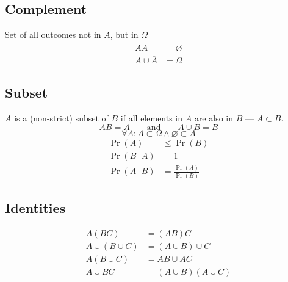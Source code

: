 \documentclass{article}
\begin{document}
\begin{multicols}{3}
    \subsection{Complement}
    Set of all outcomes not in \(A\), but in \(\Omega \)
    \begin{align*}
        A\overline{A}       & = \varnothing \\
        A \cup \overline{A} & = \Omega
    \end{align*}
    \subsection{Subset}
    \(A\) is a (non-strict) subset of \(B\) if all elements in \(A\) are also in \(B\) --- \(A \subset B\).
    \begin{equation*}
        AB = A \quad\quad \text{and} \quad\quad A \cup B = B
    \end{equation*}
    \begin{equation*}
        \forall A:A\subset \Omega \land \varnothing \subset A
    \end{equation*}
    \begin{align*}
        \Pr{\left( A \right)}             & \leq \Pr{\left( B \right)}                            \\
        \Pr{\left( B \,\vert\, A \right)} & = 1                                                   \\
        \Pr{\left( A \,\vert\, B \right)} & = \frac{\Pr{\left( A \right)}}{\Pr{\left( B \right)}}
    \end{align*}
    \subsection{Identities}
    \begin{align*}
        A \left( BC \right)            & = \left( AB \right) C                             \\
        A \cup \left( B \cup C \right) & = \left( A \cup B \right) \cup C                  \\
        A \left(B \cup C\right)        & = AB \cup AC                                      \\
        A \cup BC                      & = \left( A \cup B \right) \left( A \cup C \right)
    \end{align*}

\end{multicols}
\end{document}
